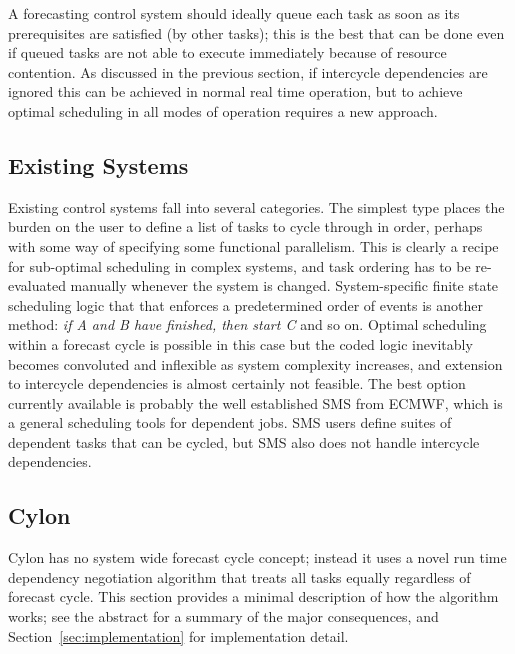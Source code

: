 \documentclass[11pt,a4paper]{article}
\begin{document}
A forecasting control system should ideally queue each task as soon as
its prerequisites are satisfied (by other tasks); this is the best that
can be done even if queued tasks are not able to execute immediately
because of resource contention. As discussed in the previous section,
if intercycle dependencies are ignored this can be achieved in normal
real time operation, but to achieve optimal scheduling in all modes of
operation requires a new approach.

\subsection{Existing Systems}

Existing control systems fall into several categories. The simplest type
places the burden on the user to define a list of tasks to cycle through
in order, perhaps with some way of specifying some functional
parallelism. This is clearly a recipe for sub-optimal scheduling in
complex systems, and task ordering has to be re-evaluated manually
whenever the system is changed. System-specific finite state scheduling
logic that that enforces a predetermined order of events is another
method: {\em if A and B have finished, then start C} and so on.  Optimal
scheduling within a forecast cycle is possible in this case but the
coded logic inevitably becomes convoluted and inflexible as system
complexity increases, and extension to intercycle dependencies is almost
certainly not feasible.  The best option currently available is probably
the well established SMS from ECMWF, which is a general scheduling tools
for dependent jobs.  SMS users define suites of dependent tasks that can
be cycled, but SMS also does not handle intercycle dependencies.  

\subsection{Cylon}

Cylon has no system wide forecast cycle concept; instead it uses a novel
run time dependency negotiation algorithm that treats all tasks equally
regardless of forecast cycle. This section provides a minimal
description of how the algorithm works; see the abstract for a summary
of the major consequences, and Section~\ref{sec:implementation} for
implementation detail.  
\end{document}
